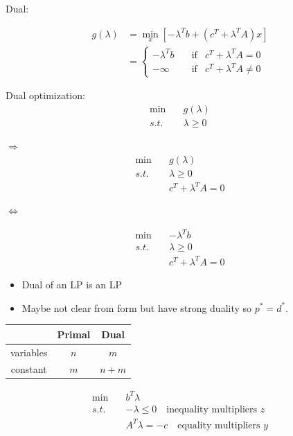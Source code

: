 Dual:

\begin{align*}
g(\lambda) &= \min_x[-\lambda^Tb+(c^T+\lambda^TA)x]\\
&=
\label{eq6}
\left\{
\begin{aligned}
-\lambda^Tb &\quad \text{if} & c^T+\lambda^TA=0 \\
-\infty &\quad \text{if} & c^T+\lambda^TA\neq 0
\end{aligned}
\right.
\end{align*}

Dual optimization:
\begin{align*}
\min\quad &g(\lambda)\\
s.t.\quad &\lambda \geq 0
\end{align*}

$\Rightarrow$
\begin{align*}
\min\quad &g(\lambda)\\
s.t.\quad &\lambda\geq 0\\
&c^T+\lambda^TA=0
\end{align*}

$\Leftrightarrow$

\begin{align*}
\min\quad &-\lambda^Tb\\
s.t.\quad &\lambda\geq 0\\
&c^T+\lambda^TA=0
\end{align*}






\begin{itemize}
	\item Dual of an LP is an LP
	
	\item Maybe not clear from form but have strong duality so $p^*=d^*$.
\end{itemize}

\begin{tabular}{|c|c|c|}
	\hline 
	&Primal & Dual\\
	\hline  
	variables & $n$ & $m$\\
	\hline 
	constant&$m$&$n+m$\\
	\hline 
\end{tabular}


\begin{align*}
\min\quad &b^T\lambda\\
s.t.\quad &-\lambda\leq 0\quad\text{inequality multipliers }z\\
&A^T\lambda = -c\quad \text{equality multipliers }y
\end{align*}

